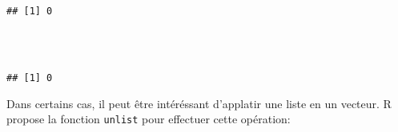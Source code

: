 \begin{knitrout}
\color{fgcolor}\begin{kframe}
\begin{flushleft}
\ttfamily\noindent
{}\hlkeyword{\usebox{\hlnormalsizeboxdollar}}\hlkeyword{+}{\ }\hlkeyword{\usebox{\hlnormalsizeboxdollar}}\hlkeyword{-}{\ }\hlkeyword{\usebox{\hlnormalsizeboxdollar}}\mbox{}
\normalfont
\end{flushleft}
\begin{verbatim}
## [1] 0
\end{verbatim}
\begin{flushleft}
\ttfamily\noindent
{}\hlkeyword{(}\hlkeyword{,}{\ }\hlkeyword{\usebox{\hlnormalsizeboxopenbrace}}\hspace*{\fill}\\
\hlstd{}{\ }{\ }{\ }{\ }\hlkeyword{+}{\ }\hlkeyword{-}{\ }\hspace*{\fill}\\
\hlstd{}\hlkeyword{\usebox{\hlnormalsizeboxclosebrace}}\hlkeyword{)}\mbox{}
\normalfont
\end{flushleft}
\begin{verbatim}
## [1] 0
\end{verbatim}
\end{kframe}
\end{knitrout}


Dans certains cas, il peut être intéréssant d'applatir une liste en un vecteur.
R propose la fonction \texttt{unlist} pour effectuer cette opération:

